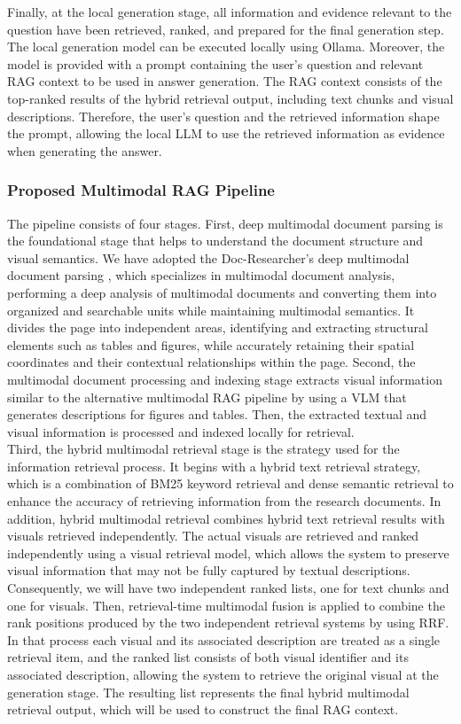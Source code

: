 \documentclass[11pt,a4paper]{report}
\begin{document}
Finally, at the local generation stage, all information and evidence relevant to the question have been retrieved, ranked, and prepared for the final generation step. The local generation model can be executed locally using Ollama. Moreover, the model is provided with a prompt containing the user’s question and relevant \ac{RAG} context to be used in answer generation. The \ac{RAG} context consists of the top-ranked results of the hybrid retrieval output, including text chunks and visual descriptions. Therefore, the user’s question and the retrieved information shape the prompt, allowing the local \ac{LLM} to use the retrieved information as evidence when generating the answer.

\subsubsection{Proposed Multimodal RAG Pipeline}
The pipeline consists of four stages. First, deep multimodal document parsing is the foundational stage that helps to understand the document structure and visual semantics. We have adopted the Doc-Researcher’s deep multimodal document parsing \cite{Dong2026DocResearcherAU}, which specializes in multimodal document analysis, performing a deep analysis of multimodal documents and converting them into organized and searchable units while maintaining multimodal semantics. It divides the page into independent areas, identifying and extracting structural elements such as tables and figures, while accurately retaining their spatial coordinates and their contextual relationships within the page. Second, the multimodal document processing and indexing stage extracts visual information similar to the alternative multimodal \ac{RAG} pipeline by using a \ac{VLM} that generates descriptions for figures and tables. Then, the extracted textual and visual information is processed and indexed locally for retrieval.\\

Third, the hybrid multimodal retrieval stage is the strategy used for the information retrieval process. It begins with a hybrid text retrieval strategy, which is a combination of \ac{BM25} keyword retrieval and dense semantic retrieval to enhance the accuracy of retrieving information from the research documents. In addition, hybrid multimodal retrieval combines hybrid text retrieval results with visuals retrieved independently. The actual visuals are retrieved and ranked independently using a visual retrieval model, which allows the system to preserve visual information that may not be fully captured by textual descriptions. Consequently, we will have two independent ranked lists, one for text chunks and one for visuals. Then, retrieval-time multimodal fusion is applied to combine the rank positions produced by the two independent retrieval systems by using \ac{RRF}. In that process each visual and its associated description are treated as a single retrieval item, and the ranked list consists of both visual identifier and its associated description, allowing the system to retrieve the original visual at the generation stage. The resulting list represents the final hybrid multimodal retrieval output, which will be used to construct the final \ac{RAG} context.\\
\end{document}
